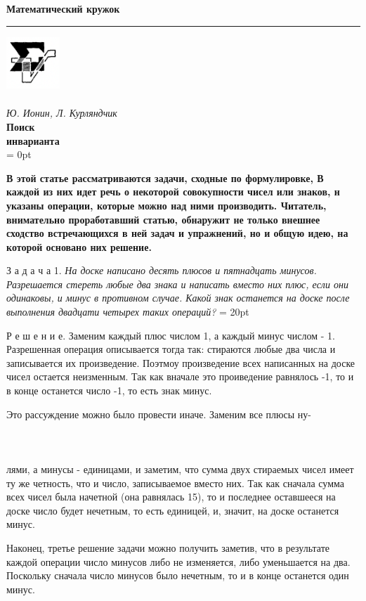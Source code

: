 \twocolumn
\textbf{\large{Математический кружок}} \\
\rule{\textwidth}{2pt}
\includegraphics[width=2cm, height=2cm]{image.png} \\\\
\textit{\large{Ю. Ионин, Л. Курляндчик}} \\
\Huge{\textbf{Поиск}} \\
\Huge{\textbf{инварианта}} \\
\parindent = 0pt
\par\large\textbf{В этой статье рассматриваются задачи, сходные по формулировке, В каждой из них идет речь о некоторой совокупности чисел или знаков, н указаны операции, которые можно над ними производить. Читатель, внимательно проработавший статью, обнаружит не только внешнее сходство встречающихся в ней задач и упражнений, но и общую идею, на которой основано них решение.}
\\
\par\Large{З а д а ч а  1. \textit{На доске написано десять плюсов и пятнадцать минусов. Разрешается стереть любые два знака и написать вместо них плюс, если они одинаковы, и минус в противном случае. Какой знак останется на доске после выполнения двадцати четырех таких операций?}}
\parindent = 20pt
\par\Large{Р е ш е н и е. Заменим каждый плюс числом 1, а каждый минус числом - 1. Разрешенная операция описывается тогда так: стираются любые два числа и записывается их произведение. Поэтмоу произведение всех написанных на доске чисел остается неизменным. Так как вначале это проиведение равнялось -1, то и в конце останется число -1, то есть знак минус.}
\par\Large{Это рассуждение можно было провести иначе. Заменим все плюсы ну-\\\\\\\\лями, а минусы - единицами, и заметим, что сумма двух стираемых чисел имеет ту же четность, что и число, записываемое вместо них. Так как сначала сумма всех чисел была начетной (она равнялась 15), то и последнее оставшееся на доске число будет нечетным, то есть единицей, и, значит, на доске останется минус.}
\par\Large{Наконец, третье решение задачи можно получить заметив, что в результате каждой операции число минусов либо не изменяется, либо уменьшается на два. Поскольку сначала число минусов было нечетным, то и в конце останется один минус.}
